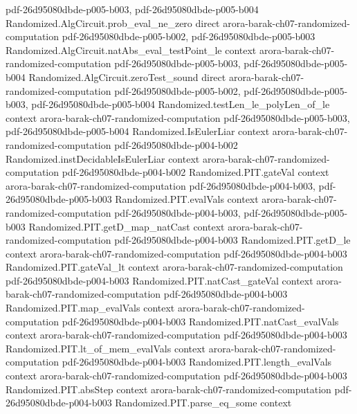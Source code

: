 \begin{theorem}
  {pdf-26d95080dbde-p005-b003,
    pdf-26d95080dbde-p005-b004}
\proofstep
  {Randomized.AlgCircuit.prob_eval_ne_zero}
  {direct}
  {arora-barak-ch07-randomized-computation}
  {pdf-26d95080dbde-p005-b002,
    pdf-26d95080dbde-p005-b003}
\proofstep
  {Randomized.AlgCircuit.natAbs_eval_testPoint_le}
  {context}
  {arora-barak-ch07-randomized-computation}
  {pdf-26d95080dbde-p005-b003,
    pdf-26d95080dbde-p005-b004}
\proofstep
  {Randomized.AlgCircuit.zeroTest_sound}
  {direct}
  {arora-barak-ch07-randomized-computation}
  {pdf-26d95080dbde-p005-b002,
    pdf-26d95080dbde-p005-b003,
    pdf-26d95080dbde-p005-b004}
\proofstep
  {Randomized.testLen_le_polyLen_of_le}
  {context}
  {arora-barak-ch07-randomized-computation}
  {pdf-26d95080dbde-p005-b003,
    pdf-26d95080dbde-p005-b004}
\proofstep
  {Randomized.IsEulerLiar}
  {context}
  {arora-barak-ch07-randomized-computation}
  {pdf-26d95080dbde-p004-b002}
\proofstep
  {Randomized.instDecidableIsEulerLiar}
  {context}
  {arora-barak-ch07-randomized-computation}
  {pdf-26d95080dbde-p004-b002}
\proofstep
  {Randomized.PIT.gateVal}
  {context}
  {arora-barak-ch07-randomized-computation}
  {pdf-26d95080dbde-p004-b003,
    pdf-26d95080dbde-p005-b003}
\proofstep
  {Randomized.PIT.evalVals}
  {context}
  {arora-barak-ch07-randomized-computation}
  {pdf-26d95080dbde-p004-b003,
    pdf-26d95080dbde-p005-b003}
\proofstep
  {Randomized.PIT.getD_map_natCast}
  {context}
  {arora-barak-ch07-randomized-computation}
  {pdf-26d95080dbde-p004-b003}
\proofstep
  {Randomized.PIT.getD_le}
  {context}
  {arora-barak-ch07-randomized-computation}
  {pdf-26d95080dbde-p004-b003}
\proofstep
  {Randomized.PIT.gateVal_lt}
  {context}
  {arora-barak-ch07-randomized-computation}
  {pdf-26d95080dbde-p004-b003}
\proofstep
  {Randomized.PIT.natCast_gateVal}
  {context}
  {arora-barak-ch07-randomized-computation}
  {pdf-26d95080dbde-p004-b003}
\proofstep
  {Randomized.PIT.map_evalVals}
  {context}
  {arora-barak-ch07-randomized-computation}
  {pdf-26d95080dbde-p004-b003}
\proofstep
  {Randomized.PIT.natCast_evalVals}
  {context}
  {arora-barak-ch07-randomized-computation}
  {pdf-26d95080dbde-p004-b003}
\proofstep
  {Randomized.PIT.lt_of_mem_evalVals}
  {context}
  {arora-barak-ch07-randomized-computation}
  {pdf-26d95080dbde-p004-b003}
\proofstep
  {Randomized.PIT.length_evalVals}
  {context}
  {arora-barak-ch07-randomized-computation}
  {pdf-26d95080dbde-p004-b003}
\proofstep
  {Randomized.PIT.absStep}
  {context}
  {arora-barak-ch07-randomized-computation}
  {pdf-26d95080dbde-p004-b003}
\proofstep
  {Randomized.PIT.parse_eq_some}
  {context}

\end{theorem}
